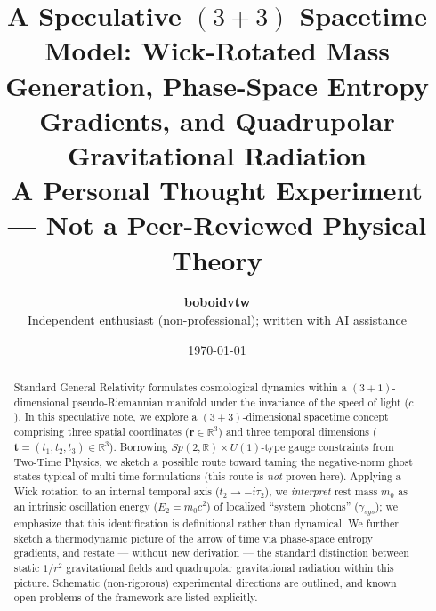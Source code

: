 \documentclass[11pt,a4paper]{article}
\title{\Large \textbf{A Speculative $(3+3)$ Spacetime Model: Wick-Rotated Mass Generation, Phase-Space Entropy Gradients, and Quadrupolar Gravitational Radiation}\\[0.8em]
\normalsize A Personal Thought Experiment --- Not a Peer-Reviewed Physical Theory}
\author{
    \textbf{boboidvtw}\\[0.5em]
    \small Independent enthusiast (non-professional); written with AI assistance
}
\date{\today}
\begin{document}
\maketitle

\begin{center}
\end{center}
\vspace{1em}

\begin{abstract}
Standard General Relativity formulates cosmological dynamics within a $(3+1)$-dimensional pseudo-Riemannian manifold under the invariance of the speed of light ($c$). In this speculative note, we explore a $(3+3)$-dimensional spacetime concept comprising three spatial coordinates ($\mathbf{r} \in \mathbb{R}^3$) and three temporal dimensions ($\mathbf{t} = (t_1, t_2, t_3) \in \mathbb{R}^3$). Borrowing $Sp(2,\mathbb{R}) \times U(1)$-type gauge constraints from Two-Time Physics, we sketch a possible route toward taming the negative-norm ghost states typical of multi-time formulations (this route is \emph{not} proven here). Applying a Wick rotation to an internal temporal axis ($t_2 \to -i \tau_2$), we \emph{interpret} rest mass $m_0$ as an intrinsic oscillation energy ($E_2 = m_0 c^2$) of localized ``system photons'' ($\gamma_{sys}$); we emphasize that this identification is definitional rather than dynamical. We further sketch a thermodynamic picture of the arrow of time via phase-space entropy gradients, and restate --- without new derivation --- the standard distinction between static $1/r^2$ gravitational fields and quadrupolar gravitational radiation within this picture. Schematic (non-rigorous) experimental directions are outlined, and known open problems of the framework are listed explicitly.
\end{abstract}

\newpage

\end{document}
